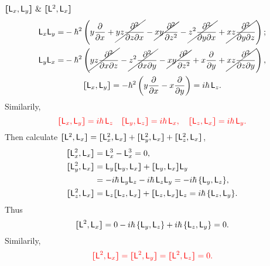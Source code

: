\documentclass{article}
\newcommand{\ko}[1]{\hspace{-#1 pt}}%
\newcommand{\su}[1]{\vspace{-#1 pt}}%
\newcommand{\pd}[2]{\frac{\partial #1}{\partial #2}}%
\newcommand{\spd}[2]{\frac{\partial^2 #1}{\partial #2^2}}
\newcommand{\tpd}[3]{\frac{\partial^2 #1}{\partial #2\partial #3}}
\newcommand{\kh}[1]{\left(#1\right)}
\newcommand{\cmm}[1]{\lfloor\ko{4.45}\lceil #1\rceil\ko{4.45}\rfloor}%
\newcommand{\spark}[1]{\textcolor{red}{#1}}
\begin{document}
\begin{example}{$\cmm{\sL_x,\sL_y}~\&~\cmm{\sL^2,\sL_x}$}{}\su{10}
	\begin{gather*}
		\begin{aligned}
			\sL_x\sL_y= & -\hbar^2\kh{y\pd{}x+\cancel{yz\tpd{}zx}-\cancel{xy\spd{}z}-\cancel{z^2\tpd{}yx}+\cancel{xz\tpd{}yz}}; \\
			\sL_y\sL_x= & -\hbar^2\kh{\cancel{yz\tpd{}xz}-\cancel{z^2\tpd{}xy}-\cancel{xy\spd{}z}+x\pd{}y+\cancel{xz\tpd{}zy}}, %
		\end{aligned}\\
		\cmm{\sL_x,\sL_y}=-\hbar^2\kh{y\pd{}x-x\pd{}y}=i\hbar\,\sL_z.
	\end{gather*}
	Similarily,
	$$\spark{\cmm{\sL_x,\sL_y}=i\hbar\,\sL_z\quad\cmm{\sL_y,\sL_z}=i\hbar\,\sL_x,\quad\cmm{\sL_z,\sL_x}=i\hbar\,\sL_y.}$$
	Then calculate $\cmm{\sL^2,\sL_x}=\cmm{\sL_x^2,\sL_x}+\cmm{\sL^2_y,\sL_x}+\cmm{\sL^2_z,\sL_x}$,
	\begin{align*}
		\cmm{\sL_x^2,\sL_x} & =\sL_x^3-\sL_x^3=0,                                                     \\
		\cmm{\sL^2_y,\sL_x} & =\sL_y\cmm{\sL_y,\sL_x}+\cmm{\sL_y,\sL_x}\sL_y                          \\
		                    & =-i\hbar\,\sL_y\sL_z-i\hbar\,\sL_z\sL_y=-i\hbar\,\{\sL_y,\sL_z\},       \\
		\cmm{\sL^2_z,\sL_x} & =\sL_z\cmm{\sL_z,\sL_x}+\cmm{\sL_z,\sL_x}\sL_z=i\hbar\,\{\sL_z,\sL_y\}.
	\end{align*}
	Thus
	$$\cmm{\sL^2,\sL_x}=0-i\hbar\,\{\sL_y,\sL_z\}+i\hbar\,\{\sL_z,\sL_y\}=0.$$
	Similarily,
	$$\spark{\cmm{\sL^2,\sL_x}=\cmm{\sL^2,\sL_y}=\cmm{\sL^2,\sL_z}=0.}$$
\end{example}
\end{document}
